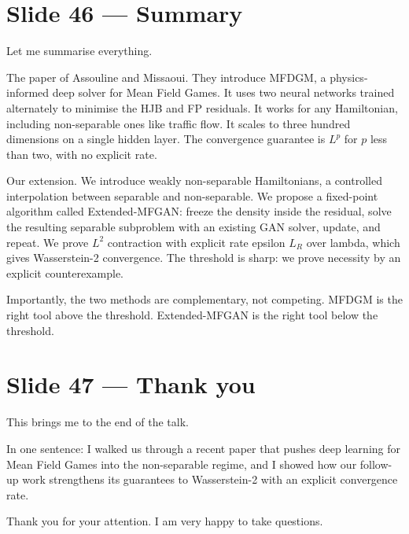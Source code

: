 \documentclass[11pt]{article}
\begin{document}
\section*{Slide 46 --- Summary}

Let me summarise everything.

The paper of Assouline and Missaoui. They introduce MFDGM, a physics-
informed deep solver for Mean Field Games. It uses two neural networks
trained alternately to minimise the HJB and FP residuals. It works for any
Hamiltonian, including non-separable ones like traffic flow. It scales to
three hundred dimensions on a single hidden layer. The convergence
guarantee is $L^p$ for $p$ less than two, with no explicit rate.

Our extension. We introduce weakly non-separable Hamiltonians, a controlled
interpolation between separable and non-separable. We propose a fixed-point
algorithm called Extended-MFGAN: freeze the density inside the residual,
solve the resulting separable subproblem with an existing GAN solver,
update, and repeat. We prove $L^2$ contraction with explicit rate epsilon
$L_R$ over lambda, which gives Wasserstein-2 convergence. The threshold
is sharp: we prove necessity by an explicit counterexample.

Importantly, the two methods are complementary, not competing. MFDGM is the
right tool above the threshold. Extended-MFGAN is the right tool below the
threshold.

\section*{Slide 47 --- Thank you}

This brings me to the end of the talk.

In one sentence: I walked us through a recent paper that pushes deep
learning for Mean Field Games into the non-separable regime, and I showed
how our follow-up work strengthens its guarantees to Wasserstein-2 with
an explicit convergence rate.

Thank you for your attention. I am very happy to take questions.
\end{document}
